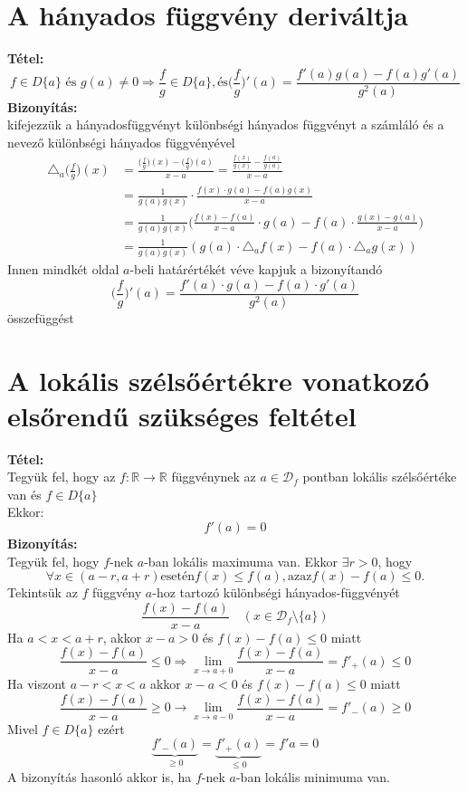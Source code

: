 \documentclass[10pt,a4paper]{article}
\newcommand{\R}{\mathbb{R}}
\newcommand{\D}{\mathcal{D}}
\newcommand{\f}[1][x]{f(#1)}
\newcommand{\g}[1][x]{g(#1)}
\newcommand{\fg}{\Big(\frac{f}{g}\Big)}
\begin{document}
\section{A hányados függvény deriváltja}
\textbf{Tétel:}
\[
f\in D\{a\} \text{ és }  g(a)\neq 0 \Longrightarrow  \frac{f}{g} \in D\{a\},  \text{és}  \Big(\frac{f}{g} \Big)' (a) = \frac{f'(a)g(a)-f(a)g'(a)}{g^2(a)}
\]
\textbf{Bizonyítás:} \\
kifejezzük a hányadosfüggvényt különbségi hányados függvényt a számláló és a nevező különbségi hányados függvényével 
\begin{align*}
\triangle_a\fg (x) &= \frac{\fg (x)-\fg (a)}{x-a} = \frac{\frac{\f}{\g}-\frac{\f[a]}{\g[a]}}{x-a}  \\
&=\frac{1}{\g[a]\g} \cdot \frac{\f\cdot\g[a] - \f[a]\g}{x-a} \\ 
&=\frac{1}{\g[a]\g} \Big(\frac{\f -\f[a]}{x-a} \cdot\g[a] -\f[a]\cdot\frac{\g -\g[a]}{x-a} \Big) \\
&=\frac{1}{\g[a]\g} (\g[a]\cdot\triangle_a \f -\f[a]\cdot\triangle_a \g )
\end{align*}
Innen mindkét oldal $a$-beli határértékét véve kapjuk a bizonyítandó 
\[
\fg '(a) = \frac{f'(a)\cdot\g[a] - \f[a]\cdot g'(a)}{g^2 (a)}
\]
összefüggést
\newpage
\section{A lokális szélsőértékre vonatkozó elsőrendű szükséges feltétel}
\textbf{Tétel:} \\
Tegyük fel, hogy az $f:\R\rightarrow\R$ függvénynek az $a\in\D_f$ pontban lokális szélsőértéke van és $f\in D\{a\}$ \\
Ekkor:
\[
f'(a)=0
\]
\textbf{Bizonyítás:} \\
Tegyük fel, hogy $f$-nek $a$-ban lokális maximuma van. Ekkor $\exists r>0$, hogy 
\[
\forall x \in (a-r,a+r) \text{esetén} \f \leq f(a), \text{azaz} \f - f(a) \leq 0.
\]  
Tekintsük az $f$ függvény $a$-hoz tartozó különbségi hányados-függvényét
\[
\frac{\f -f(a)}{x-a} \quad (x\in \D_f \setminus \{a\})
\]
Ha $a<x<a+r$, akkor $x-a>0$ és $\f- f(a)\leq 0$ miatt
\[
\frac{\f -f(a)}{x-a} \leq 0 \Longrightarrow \lim\limits_{x\rightarrow a+0} \frac{\f -f(a)}{x-a} = f'_+ (a) \leq 0 
\]
Ha viszont $a-r<x<a$ akkor $x-a<0$ és $\f - f(a) \leq 0$ miatt
\[
\frac{\f -f(a)}{x-a} \geq 0 \longrightarrow \lim_{x\rightarrow a-0} \frac{\f -f(a)}{x-a} = f'_- (a) \geq 0 
\]
Mivel $f\in D\{a\}$ ezért
\[
\underbrace{f'_- (a)}_{\geq 0}  = \underbrace{f'_+ (a)}_{\leq 0}  = f' a = 0  
\]
A bizonyítás hasonló akkor is, ha $f$-nek $a$-ban lokális minimuma van.
\newpage
\end{document}
